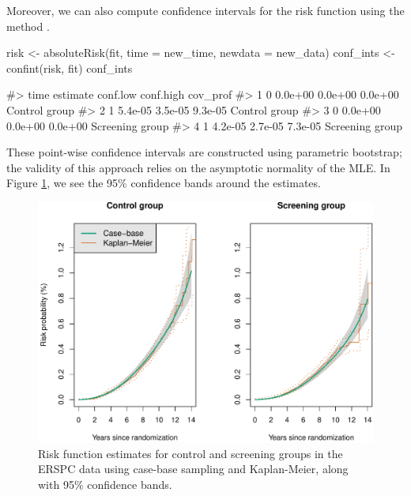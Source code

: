 Moreover, we can also compute confidence intervals for the risk function
using the method .

\begin{Schunk}
\begin{Sinput}
risk <- absoluteRisk(fit, time = new_time, newdata = new_data)
conf_ints <- confint(risk, fit)
conf_ints
\end{Sinput}
\begin{Soutput}
#>   time estimate conf.low conf.high        cov_prof
#> 1    0  0.0e+00  0.0e+00   0.0e+00   Control group
#> 2    1  5.4e-05  3.5e-05   9.3e-05   Control group
#> 3    0  0.0e+00  0.0e+00   0.0e+00 Screening group
#> 4    1  4.2e-05  2.7e-05   7.3e-05 Screening group
\end{Soutput}
\end{Schunk}

These point-wise confidence intervals are constructed using parametric
bootstrap; the validity of this approach relies on the asymptotic
normality of the MLE. In Figure \ref{fig:erspc-cif-conf}, we see the
95\% confidence bands around the estimates.

\begin{Schunk}
\begin{figure}[ht]
\includegraphics[width=\textwidth,keepaspectratio=true]{./erspc-cif-conf-1} \caption[Risk function estimates for control and screening groups in the ERSPC data using case-base sampling and Kaplan-Meier, along with 95\% confidence bands]{Risk function estimates for control and screening groups in the ERSPC data using case-base sampling and Kaplan-Meier, along with 95\% confidence bands.}\label{fig:erspc-cif-conf}
\end{figure}
\end{Schunk}

